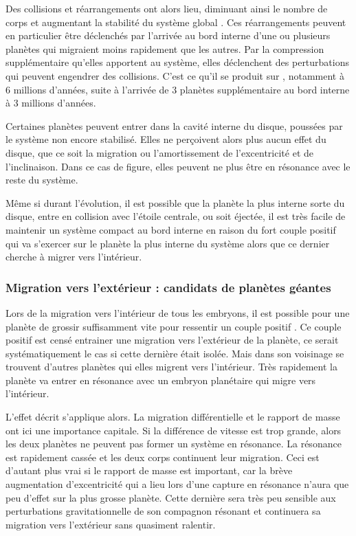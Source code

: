 Des collisions et réarrangements ont alors lieu, diminuant ainsi le nombre de corps et augmentant la stabilité du système global . Ces réarrangements peuvent en particulier être déclenchés par l'arrivée au bord interne d'une ou plusieurs planètes qui migraient moins rapidement que les autres. Par la compression supplémentaire qu'elles apportent au système, elles déclenchent des perturbations qui peuvent engendrer des collisions. C'est ce qu'il se produit sur  , notamment à 6 millions d'années, suite à l'arrivée de 3 planètes supplémentaire au bord interne à 3 millions d'années. 

\bigskip

Certaines planètes peuvent entrer dans la cavité interne du disque, poussées par le système non encore stabilisé. Elles ne perçoivent alors plus aucun effet du disque, que ce soit la migration ou l'amortissement de l'excentricité et de l'inclinaison. Dans ce cas de figure, elles peuvent ne plus être en résonance avec le reste du système. 

Même si durant l'évolution, il est possible que la planète la plus interne sorte du disque, entre en collision avec l'étoile centrale, ou soit éjectée, il est très facile de maintenir un système compact au bord interne en raison du fort couple positif qui va s'exercer sur le planète la plus interne du système alors que ce dernier cherche à migrer vers l'intérieur.

\subsubsection{Migration vers l'extérieur : candidats de planètes géantes}\label{sec:outward-case}
Lors de la migration vers l'intérieur de tous les embryons, il est possible pour une planète de grossir suffisamment vite pour ressentir un couple positif . Ce couple positif est censé entrainer une migration vers l'extérieur de la planète, ce serait systématiquement le cas si cette dernière était isolée. Mais dans son voisinage se trouvent d'autres planètes qui elles migrent vers l'intérieur. Très rapidement la planète va entrer en résonance avec un embryon planétaire qui migre vers l'intérieur.

L'effet décrit  s'applique alors. La migration différentielle et le rapport de masse ont ici une importance capitale. Si la différence de vitesse est trop grande, alors les deux planètes ne peuvent pas former un système en résonance. La résonance est rapidement cassée et les deux corps continuent leur migration. Ceci est d'autant plus vrai si le rapport de masse est important, car la brève augmentation d'excentricité qui a lieu lors d'une capture en résonance n'aura que peu d'effet sur la plus grosse planète. Cette dernière sera très peu sensible aux perturbations gravitationnelle de son compagnon résonant et continuera sa migration vers l'extérieur sans quasiment ralentir. 

